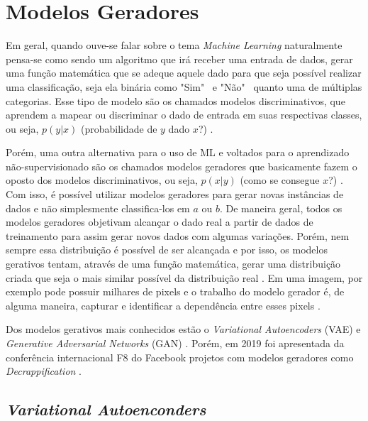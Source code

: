 \section{Modelos Geradores} \label{ssec:generative-vs-discriminative}

Em geral, quando ouve-se falar sobre o tema \textit{Machine Learning} naturalmente pensa-se como sendo um algoritmo que irá receber uma entrada de dados, gerar uma função matemática que se adeque aquele dado para que seja possível realizar uma classificação, seja ela binária como "Sim" \  e "Não" \  quanto uma de múltiplas categorias. Esse tipo de modelo são os chamados modelos discriminativos, que aprendem a mapear ou discriminar o dado de entrada em suas respectivas classes, ou seja, \(p(y | x)\) (probabilidade de $y$ dado $x$?) \cite{discriminative-vs-generative}.

Porém, uma outra alternativa para o uso de ML e voltados para o aprendizado não-supervisionado são os chamados modelos geradores que basicamente fazem o oposto dos modelos discriminativos, ou seja, \(p(x | y)\) (como se consegue $x$?) \cite{deep-learning-book-br}. Com isso, é possível utilizar modelos geradores para gerar novas instâncias de dados e não simplesmente classifica-los em $a$ ou $b$. De maneira geral, todos os modelos geradores objetivam alcançar o dado real a partir de dados de treinamento para assim gerar novos dados com algumas variações. Porém, nem sempre essa distribuição é possível de ser alcançada e por isso, os modelos gerativos tentam, através de uma função matemática, gerar uma distribuição criada que seja o mais similar possível da distribuição real \cite{deep-generative-models}. Em uma imagem, por exemplo pode possuir milhares de pixels e o trabalho do modelo gerador é, de alguma maneira, capturar e identificar a dependência entre esses pixels \cite{variational-autoencoders}.

Dos modelos gerativos mais conhecidos estão o \textit{Variational Autoencoders} (VAE) \cite{variational-autoencoders} e \textit{Generative Adversarial Networks} (GAN) \cite{generative-adversarial-networks}. Porém, em 2019 foi apresentada da conferência internacional F8 do Facebook projetos com modelos geradores como \textit{Decrappification} \cite{f8-decrappification}.

\subsection{\textit{Variational Autoenconders}}

